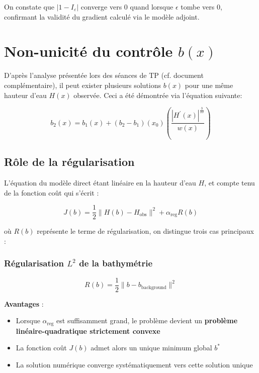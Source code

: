 \documentclass{article}
\begin{document}
On constate que \( | 1 - I_\varepsilon | \) converge vers $0$ quand lorsque $\epsilon$  tombe vers $0$, confirmant la validité du gradient calculé via le modèle adjoint.


\section{Non-unicité du contrôle \( b(x) \)}
\label{subsec:non_unicite}

D'après l'analyse présentée lors des séances de TP (cf. document complémentaire), il peut exister plusieurs solutions \( b(x) \) pour une même hauteur d'eau \( H(x) \) observée. Ceci a été démontrée via l'équation suivante:

\begin{equation}
b_2(x) = b_1(x) + (b_2 - b_1)(x_0) \left(\frac{|H^{\prime}(x)|^{\frac{3}{10}}}{w(x)}\right)
\label{eq:non_unicite}
\end{equation}

\subsection{Rôle de la régularisation}
L'équation du modèle direct étant linéaire en la hauteur d'eau \( H \), et compte tenu de la fonction coût qui s'écrit :

\begin{equation}
J(b) = \frac{1}{2}\|H(b) - H_{\text{obs}}\|^2 + \alpha_{\text{reg}} R(b)
\label{eq:loss}
\end{equation}

où \( R(b) \) représente le terme de régularisation, on distingue trois cas principaux :

\subsubsection{Régularisation \( L^2 \) de la bathymétrie}
\begin{equation}
R(b) = \frac{1}{2}\|b - b_{\text{background}}\|^2
\end{equation}

\textbf{Avantages} :
\begin{itemize}
\item Lorsque \( \alpha_{\text{reg}} \) est suffisamment grand, le problème devient un \textbf{problème linéaire-quadratique strictement convexe}
\item La fonction coût \( J(b) \) admet alors un unique minimum global \( b^* \)
\item La solution numérique converge systématiquement vers cette solution unique
\end{itemize}
\end{document}
